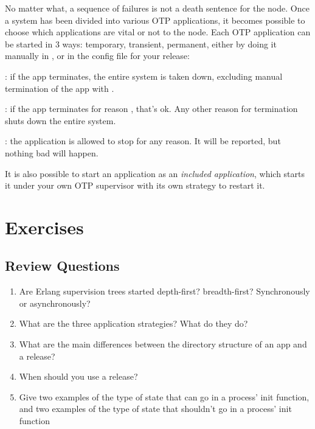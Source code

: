 No matter what, a sequence of failures is not a death sentence for the node. Once a system has been divided into various OTP applications, it becomes possible to choose which applications are vital or not to the node. Each OTP application can be started in 3 ways: temporary, transient, permanent, either by doing it manually in , or in the config file for your release:

\begin{itemize*}
	\item {}: if the app terminates, the entire system is taken down, excluding manual termination of the app with .
	\item {}: if the app terminates for reason , that's ok. Any other reason for termination shuts down the entire system.
	\item {}: the application is allowed to stop for any reason. It will be reported, but nothing bad will happen.
\end{itemize*}

It is also possible to start an application as an \emph{included application}, which starts it under your own OTP supervisor with its own strategy to restart it.

\section{Exercises}

\subsection*{Review Questions}

\begin{enumerate}
	\item  Are Erlang supervision trees started depth-first? breadth-first? Synchronously or asynchronously?
	\item What are the three application strategies? What do they do?
	\item What are the main differences between the directory structure of an app and a release?
	\item When should you use a release?
	\item Give two examples of the type of state that can go in a process' init function, and two examples of the type of state that shouldn't go in a process' init function
\end{enumerate}

